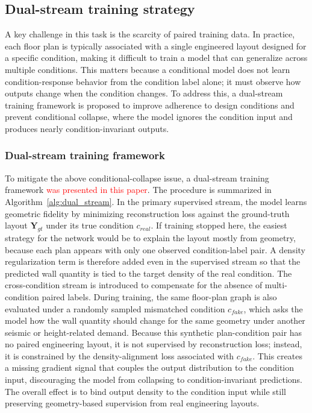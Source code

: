 \subsection{Dual-stream training strategy}
\label{subsec:training_strategy}

A key challenge in this task is the scarcity of paired training data. In practice, each floor plan is typically associated with a single engineered layout designed for a specific condition, making it difficult to train a model that can generalize across multiple conditions. This matters because a conditional model does not learn condition-response behavior from the condition label alone; it must observe how outputs change when the condition changes. To address this, a dual-stream training framework is proposed to improve adherence to design conditions and prevent conditional collapse, where the model ignores the condition input and produces nearly condition-invariant outputs.

\subsubsection{Dual-stream training framework}

To mitigate the above conditional-collapse issue, a dual-stream training framework \textcolor{red}{was presented in this paper}. The procedure is summarized in Algorithm~\ref{alg:dual_stream}. In the primary supervised stream, the model learns geometric fidelity by minimizing reconstruction loss against the ground-truth layout $\mathbf{Y}_{gt}$ under its true condition $c_{real}$. If training stopped here, the easiest strategy for the network would be to explain the layout mostly from geometry, because each plan appears with only one observed condition-label pair. A density regularization term is therefore added even in the supervised stream so that the predicted wall quantity is tied to the target density of the real condition. The cross-condition stream is introduced to compensate for the absence of multi-condition paired labels. During training, the same floor-plan graph is also evaluated under a randomly sampled mismatched condition $c_{fake}$, which asks the model how the wall quantity should change for the same geometry under another seismic or height-related demand. Because this synthetic plan-condition pair has no paired engineering layout, it is not supervised by reconstruction loss; instead, it is constrained by the density-alignment loss associated with $c_{fake}$. This creates a missing gradient signal that couples the output distribution to the condition input, discouraging the model from collapsing to condition-invariant predictions. The overall effect is to bind output density to the condition input while still preserving geometry-based supervision from real engineering layouts.


